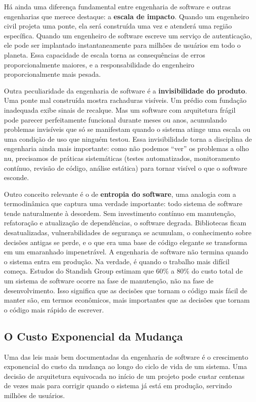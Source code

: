 Há ainda uma diferença fundamental entre engenharia de software e outras
engenharias que merece destaque: a \textbf{escala de impacto}. Quando um
engenheiro civil projeta uma ponte, ela será construída uma vez e atenderá
uma região específica. Quando um engenheiro de software escreve um serviço
de autenticação, ele pode ser implantado instantaneamente para milhões de
usuários em todo o planeta. Essa capacidade de escala torna as consequências
de erros proporcionalmente maiores, e a responsabilidade do engenheiro
proporcionalmente mais pesada.

Outra peculiaridade da engenharia de software é a \textbf{invisibilidade
do produto}. Uma ponte mal construída mostra rachaduras visíveis. Um
prédio com fundação inadequada exibe sinais de recalque. Mas um software
com arquitetura frágil pode parecer perfeitamente funcional durante meses
ou anos, acumulando problemas invisíveis que só se manifestam quando o
sistema atinge uma escala ou uma condição de uso que ninguém testou. Essa
invisibilidade torna a disciplina de engenharia ainda mais importante:
como não podemos ``ver'' os problemas a olho nu, precisamos de práticas
sistemáticas (testes automatizados, monitoramento contínuo, revisão de
código, análise estática) para tornar visível o que o software esconde.

Outro conceito relevante é o de \textbf{entropia do software}, uma
analogia com a termodinâmica que captura uma verdade importante: todo
sistema de software tende naturalmente à desordem. Sem investimento
contínuo em manutenção, refatoração e atualização de dependências, o
software degrada. Bibliotecas ficam desatualizadas, vulnerabilidades de
segurança se acumulam, o conhecimento sobre decisões antigas se perde, e
o que era uma base de código elegante se transforma em um emaranhado
impenetrável. A engenharia de software não termina quando o sistema entra
em produção. Na verdade, é quando o trabalho mais difícil começa. Estudos
do Standish Group estimam que 60\% a 80\% do custo total de um sistema de
software ocorre na fase de manutenção, não na fase de desenvolvimento.
Isso significa que as decisões que tornam o código mais fácil de manter
são, em termos econômicos, mais importantes que as decisões que tornam o
código mais rápido de escrever.

\subsection{O Custo Exponencial da Mudança}

Uma das leis mais bem documentadas da engenharia de software é o crescimento
exponencial do custo da mudança ao longo do ciclo de vida de um sistema. Uma
decisão de arquitetura equivocada no início de um projeto pode custar centenas
de vezes mais para corrigir quando o sistema já está em produção, servindo
milhões de usuários.

